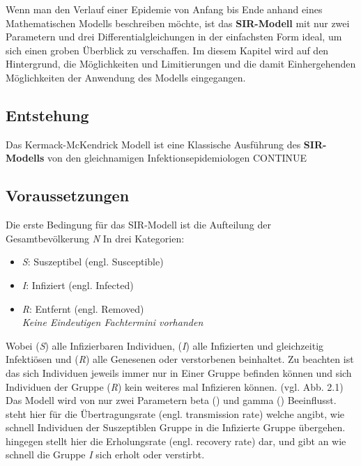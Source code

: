 \documentclass[12pt]{scrartcl} %
\begin{document}
Wenn man den Verlauf einer Epidemie von Anfang bis Ende anhand eines Mathematischen Modells beschreiben möchte, ist das \textbf{SIR-Modell} 
mit nur zwei Parametern und drei Differentialgleichungen in der einfachsten Form ideal, um sich einen groben Überblick zu verschaffen. \cite[vgl.]{4}
Im diesem Kapitel wird auf den Hintergrund, die Möglichkeiten und Limitierungen und die damit Einhergehenden Möglichkeiten der Anwendung des Modells eingegangen.

\subsection{Entstehung}

Das Kermack-McKendrick Modell ist eine Klassische Ausführung des \textbf{SIR-Modells} von den gleichnamigen Infektionsepidemiologen CONTINUE


\subsection{Voraussetzungen}

Die erste Bedingung für das SIR-Modell ist die Aufteilung der Gesamtbevölkerung \textit{N} In drei Kategorien:

\begin{itemize}
	\item \textit{S}: Suszeptibel (engl. Susceptible)
	\item \textit{I}: Infiziert (engl. Infected)
	\item \textit{R}: Entfernt (engl. Removed)\\
	\small \textsl{Keine Eindeutigen Fachtermini vorhanden}
\end{itemize}
\normalsize

Wobei (\textit{S}) alle Infizierbaren Individuen, (\textit{I}) alle Infizierten und gleichzeitig Infektiösen und (\textit{R}) alle Genesenen oder verstorbenen beinhaltet.  Zu beachten ist das sich Individuen jeweils immer nur in Einer Gruppe befinden können und sich Individuen der Gruppe 
(\textit{R}) kein weiteres mal Infizieren können. (vgl. Abb. 2.1) %
Das Modell wird von nur zwei Parametern beta (\textbeta) und gamma (\textgamma) Beeinflusst. 
\textbeta \space steht hier für die Übertragungsrate (engl. transmission rate) welche angibt, wie schnell Individuen der Suszeptiblen Gruppe in die Infizierte Gruppe übergehen. 
\textgamma \space hingegen stellt hier die Erholungsrate (engl. recovery rate) dar, und gibt an wie schnell die Gruppe \textit{I} sich erholt oder verstirbt.
\end{document}
